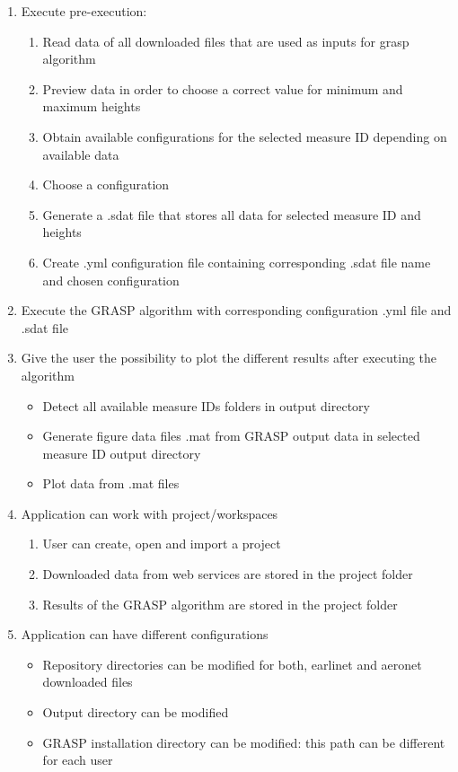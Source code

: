 \begin{enumerate}
    \item {Execute pre-execution:}
    \begin{enumerate}
      \item {Read data of all downloaded files that are used as inputs for grasp algorithm}
      \item {Preview data in order to choose a correct value for minimum and maximum heights}
      \item {Obtain available configurations for the selected measure ID depending on available data}
      \item {Choose a configuration}
      \item {Generate a .sdat file that stores all data for selected measure ID and heights}
      \item {Create .yml configuration file containing corresponding .sdat file name and chosen configuration}
    \end{enumerate}
    \item {Execute the GRASP algorithm with corresponding configuration .yml file and .sdat file}
    \item {Give the user the possibility to plot the different results after executing the algorithm}
    \begin{itemize}
      \item {Detect all available measure IDs folders in output directory}
      \item {Generate figure data files .mat from GRASP output data in selected measure ID output directory}
      \item {Plot data from .mat files}
    \end{itemize}
    \item {Application can work with project/workspaces}
    \begin{enumerate}
      \item {User can create, open and import a project}
      \item {Downloaded data from web services are stored in the project folder}
      \item {Results of the GRASP algorithm are stored in the project folder}
    \end{enumerate}
    \item {Application can have different configurations}
    \begin{itemize}
      \item {Repository directories can be modified for both, earlinet and aeronet downloaded files}
      \item {Output directory can be modified}
      \item {GRASP installation directory can be modified: this path can be different for each user}
    \end{itemize}
\end{enumerate}
\bigskip